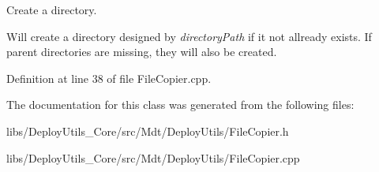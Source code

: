Create a directory. 

Will create a directory designed by {\itshape directory\+Path} if it not allready exists. If parent directories are missing, they will also be created. 

Definition at line 38 of file File\+Copier.\+cpp.



The documentation for this class was generated from the following files\+:\begin{DoxyCompactItemize}
\item 
libs/\+Deploy\+Utils\+\_\+\+Core/src/\+Mdt/\+Deploy\+Utils/File\+Copier.\+h\item 
libs/\+Deploy\+Utils\+\_\+\+Core/src/\+Mdt/\+Deploy\+Utils/File\+Copier.\+cpp\end{DoxyCompactItemize}
